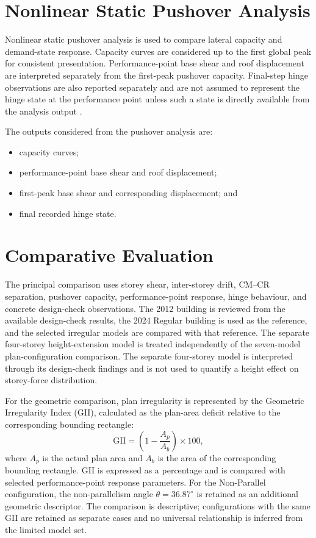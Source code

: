 \section{Nonlinear Static Pushover Analysis}
Nonlinear static pushover analysis is used to compare lateral capacity and demand-state response. Capacity curves are considered up to the first global peak for consistent presentation. Performance-point base shear and roof displacement are interpreted separately from the first-peak pushover capacity. Final-step hinge observations are also reported separately and are not assumed to represent the hinge state at the performance point unless such a state is directly available from the analysis output \cite{atc1996atc40,fema2005fema440,asce2017asce41}.

The outputs considered from the pushover analysis are:
\begin{itemize}[leftmargin=0.8cm,itemsep=0.15em,topsep=0.2em,parsep=0pt]
    \item capacity curves;
    \item performance-point base shear and roof displacement;
    \item first-peak base shear and corresponding displacement; and
    \item final recorded hinge state.
\end{itemize}



\section{Comparative Evaluation}
The principal comparison uses storey shear, inter-storey drift, CM--CR separation, pushover capacity, performance-point response, hinge behaviour, and concrete design-check observations. The 2012 building is reviewed from the available design-check results, the 2024 Regular building is used as the reference, and the selected irregular models are compared with that reference. The separate four-storey height-extension model is treated independently of the seven-model plan-configuration comparison. The separate four-storey model is interpreted through its design-check findings and is not used to quantify a height effect on storey-force distribution.

For the geometric comparison, plan irregularity is represented by the Geometric Irregularity Index (GII), calculated as the plan-area deficit relative to the corresponding bounding rectangle:
\begin{equation}
\mathrm{GII}=\left(1-\frac{A_p}{A_b}\right)\times 100,
\label{eq:gii_plan_deficit}
\end{equation}
\ifdefined\PURegisterEquationEntry
{}
\fi
where $A_p$ is the actual plan area and $A_b$ is the area of the corresponding bounding rectangle. GII is expressed as a percentage and is compared with selected performance-point response parameters. For the Non-Parallel configuration, the non-parallelism angle $\theta=36.87^{\circ}$ is retained as an additional geometric descriptor. The comparison is descriptive; configurations with the same GII are retained as separate cases and no universal relationship is inferred from the limited model set.

